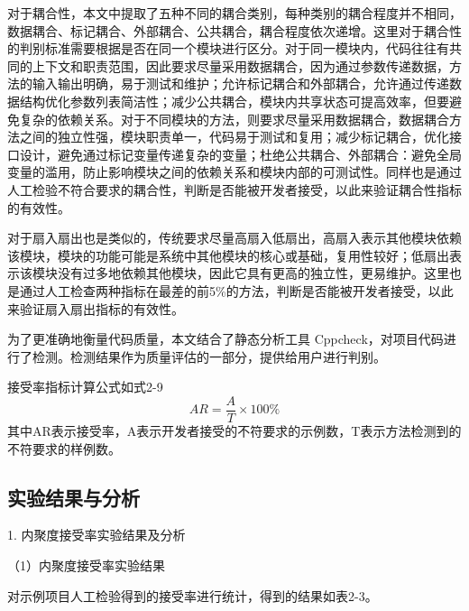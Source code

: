 对于耦合性，本文中提取了五种不同的耦合类别，每种类别的耦合程度并不相同，数据耦合、标记耦合、外部耦合、公共耦合，耦合程度依次递增。这里对于耦合性的判别标准需要根据是否在同一个模块进行区分。对于同一模块内，代码往往有共同的上下文和职责范围，因此要求尽量采用数据耦合，因为通过参数传递数据，方法的输入输出明确，易于测试和维护；允许标记耦合和外部耦合，允许通过传递数据结构优化参数列表简洁性；减少公共耦合，模块内共享状态可提高效率，但要避免复杂的依赖关系。对于不同模块的方法，则要求尽量采用数据耦合，数据耦合方法之间的独立性强，模块职责单一，代码易于测试和复用；减少标记耦合，优化接口设计，避免通过标记变量传递复杂的变量；杜绝公共耦合、外部耦合：避免全局变量的滥用，防止影响模块之间的依赖关系和模块内部的可测试性。同样也是通过人工检验不符合要求的耦合性，判断是否能被开发者接受，以此来验证耦合性指标的有效性。

对于扇入扇出也是类似的，传统要求尽量高扇入低扇出，高扇入表示其他模块依赖该模块，模块的功能可能是系统中其他模块的核心或基础，复用性较好；低扇出表示该模块没有过多地依赖其他模块，因此它具有更高的独立性，更易维护。这里也是通过人工检查两种指标在最差的前5\%的方法，判断是否能被开发者接受，以此来验证扇入扇出指标的有效性。

为了更准确地衡量代码质量，本文结合了静态分析工具 Cppcheck，对项目代码进行了检测。检测结果作为质量评估的一部分，提供给用户进行判别。

接受率指标计算公式如式2-9
\begin{equation}
{AR} = \frac{A}{T} \times 100\%
\end{equation}
其中AR表示接受率，A表示开发者接受的不符要求的示例数，T表示方法检测到的不符要求的样例数。




\subsection{实验结果与分析}
1. 内聚度接受率实验结果及分析

（1）内聚度接受率实验结果

对示例项目人工检验得到的接受率进行统计，得到的结果如表2-3。

